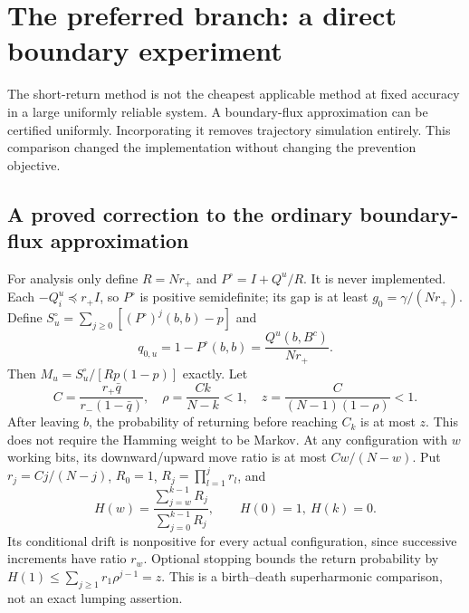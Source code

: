 \section{The preferred branch: a direct boundary experiment}
\label{sec:boundary}
The short-return method is not the cheapest applicable method at fixed accuracy in a large uniformly reliable system. A boundary-flux approximation can be certified uniformly. Incorporating it removes trajectory simulation entirely. This comparison changed the implementation without changing the prevention objective.

\subsection{A proved correction to the ordinary boundary-flux approximation}
For analysis only define $R=Nr_+$ and $P^\circ=I+Q^u/R$. It is never implemented. Each $-Q_i^u\preceq r_+I$, so $P^\circ$ is positive semidefinite; its gap is at least $g_0=\gamma/(Nr_+)$. Define $S_u^\circ=\sum_{j\ge0}[(P^\circ)^j(b,b)-p]$ and
\begin{equation}
 q_{0,u}=1-P^\circ(b,b)=\frac{Q^u(b,B^c)}{Nr_+}.
 \label{eq:q0}
\end{equation}
Then $M_u=S_u^\circ/[R p(1-p)]$ exactly. Let
\begin{equation}
 C=\frac{r_+\bar q}{r_-(1-\bar q)},\quad
 \rho=\frac{Ck}{N-k}<1,\quad z=\frac{C}{(N-1)(1-\rho)}<1.
 \label{eq:boundaryconstants}
\end{equation}
After leaving $b$, the probability of returning before reaching $C_k$ is at most $z$. This does not require the Hamming weight to be Markov. At any configuration with $w$ working bits, its downward/upward move ratio is at most $Cw/(N-w)$. Put $r_j=Cj/(N-j)$, $R_0=1$, $R_j=\prod_{l=1}^j r_l$, and
\[
 H(w)=\frac{\sum_{j=w}^{k-1}R_j}{\sum_{j=0}^{k-1}R_j},\qquad H(0)=1,\ H(k)=0.
\]
Its conditional drift is nonpositive for every actual configuration, since successive increments have ratio $r_w$. Optional stopping bounds the return probability by $H(1)\le\sum_{j\ge1}r_1\rho^{j-1}=z$. This is a birth--death superharmonic comparison, not an exact lumping assertion.

